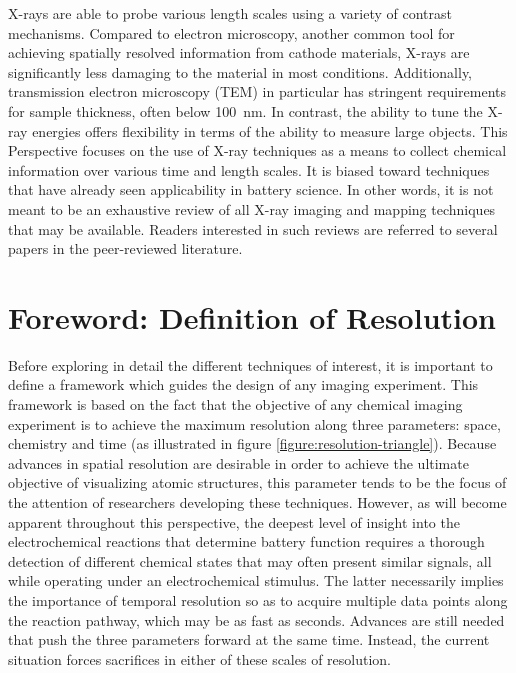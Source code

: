 \documentclass[journal=cmatex,manuscript=perspective]{achemso}
\begin{document}
X-rays are able to probe various length scales using a variety of
contrast mechanisms. Compared to electron microscopy, another common
tool for achieving spatially resolved information from cathode
materials, X-rays are significantly less damaging to the material in
most conditions. Additionally, transmission electron microscopy (TEM)
in particular has stringent requirements for sample thickness, often
below \SI{100}{nm}. In contrast, the ability to tune the X-ray
energies offers flexibility in terms of the ability to measure large
objects. This Perspective focuses on the use of X-ray techniques as a
means to collect chemical information over various time and length
scales. It is biased toward techniques that have already seen
applicability in battery science. In other words, it is not meant to
be an exhaustive review of all X-ray imaging and mapping techniques
that may be available. Readers interested in such reviews are referred
to several papers in the peer-reviewed literature\cite{rose2013,
  maire2014, monteiro2013, kawahara2015}.

\section{Foreword: Definition of Resolution}

Before exploring in detail the different techniques of interest, it is
important to define a framework which guides the design of any imaging
experiment. This framework is based on the fact that the objective of
any chemical imaging experiment is to achieve the maximum resolution
along three parameters: space, chemistry and time (as illustrated in
figure \ref{figure:resolution-triangle}). Because advances in spatial
resolution are desirable in order to achieve the ultimate objective of
visualizing atomic structures, this parameter tends to be the focus of
the attention of researchers developing these techniques. However, as
will become apparent throughout this perspective, the deepest level of
insight into the electrochemical reactions that determine battery
function requires a thorough detection of different chemical states
that may often present similar signals, all while operating under an
electrochemical stimulus. The latter necessarily implies the
importance of temporal resolution so as to acquire multiple data
points along the reaction pathway, which may be as fast as
seconds. Advances are still needed that push the three parameters
forward at the same time. Instead, the current situation forces
sacrifices in either of these scales of resolution.
\end{document}
